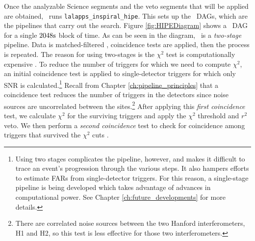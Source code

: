 Once the analyzable Science segments and the veto segments that will be applied
are obtained, \ihope~runs \texttt{lalapps\_inspiral\_hipe}. This sets up the
\hipe~\acp{DAG}, which are the pipelines that carry out the search. Figure
\ref{fig:HIPEDiagram} shows a \hipe~\ac{DAG} for a single $2048\rm{s}$ block of
time. As can be seen in the diagram, \hipe~is a \emph{two-stage} pipeline. Data
is matched-filtered \cite{Brown}, coincidence tests \cite{Robinson:2004} are applied, then the process is
repeated. The reason for using two-stages is the $\chi^2$ test is
computationally expensive \cite{Allen:2005fk}. To reduce the number of triggers for which we need
to compute $\chi^2$, an initial coincidence test is applied to single-detector
triggers for which only \ac{SNR} is calculated.\footnote{Using two stages
complicates the pipeline, however, and makes it difficult to trace an event's
progression through the various steps. It also hampers efforts to estimate
\acp{FAR} from single-detector triggers. For this reason, a single-stage
pipeline is being developed which takes advantage of advances in computational
power. See Chapter \ref{ch:future_developments} for more details.} Recall from
Chapter \ref{ch:pipeline_principles} that a coincidence test reduces the number
of triggers in the detectors since noise sources are uncorrelated between the
sites.\footnote{There are correlated noise sources between the two Hanford
interferometers, H1 and H2, so this test is less effective for those two
interferometers.} After applying this \emph{first coincidence} test, we
calculate $\chi^2$ for the surviving triggers and apply the $\chi^2$ threshold
and $r^2$ veto. We then perform a \emph{second coincidence} test to check for
coincidence among triggers that survived the $\chi^2$ cuts \cite{Allen:2005fk}.

